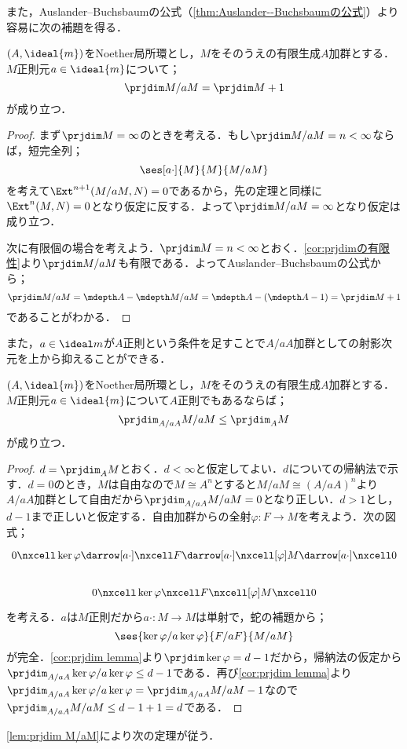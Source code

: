 また，Auslander--Buchsbaumの公式（\ref{thm:Auslander--Buchsbaumの公式}）より容易に次の補題を得る．

\begin{lem}\label{lem:prjdim M/aM}
	$(A,\ideal{m})$をNoether局所環とし，$M$をそのうえの有限生成$A$加群とする．$M$正則元$a\in\ideal{m}$について；
	\[\prjdim M/aM=\prjdim M+1\]
	が成り立つ．
\end{lem}

\begin{proof}
	まず$\prjdim M=\infty$のときを考える．もし$\prjdim M/aM=n<\infty$ならば，短完全列；
	\[\ses[a\cdot]{M}{M}{M/aM}\]
	を考えて$\Ext^{n+1}(M/aM,N)=0$であるから，先の定理と同様に$\Ext^n(M,N)=0$となり仮定に反する．よって$\prjdim M/aM=\infty$となり仮定は成り立つ．
	
	次に有限個の場合を考えよう．$\prjdim M=n<\infty$とおく．\ref{cor:prjdimの有限性}より$\prjdim M/aM$も有限である．よってAuslander--Buchsbaumの公式から；
	\[\prjdim M/aM=\mdepth A-\mdepth M/aM=\mdepth A-(\mdepth A-1)=\prjdim M+1\]
	であることがわかる．
\end{proof}

また，$a\in\ideal m$が$A$正則という条件を足すことで$A/aA$加群としての射影次元を上から抑えることができる．

\begin{lem}\label{lem:prjdim_A/aA M/aM}
	$(A,\ideal{m})$をNoether局所環とし，$M$をそのうえの有限生成$A$加群とする．$M$正則元$a\in\ideal{m}$について$A$正則でもあるならば；
	\[\prjdim_{A/aA} M/aM\leq \prjdim_A M\]
	が成り立つ．
\end{lem}

\begin{proof}
	$d=\prjdim_A M$とおく．$d<\infty$と仮定してよい．$d$についての帰納法で示す．$d=0$のとき，$M$は自由なので$M\cong A^n$とすると$M/aM\cong(A/aA)^n$より$A/aA$加群として自由だから$\prjdim_{A/aA}M/aM=0$となり正しい．$d>1$とし，$d-1$まで正しいと仮定する．自由加群からの全射$\varphi:F\to M$を考えよう．次の図式；
	\[\begin{tikzcd}
		0\nxcell\ker\varphi\darrow[a\cdot]\nxcell F\darrow[a\cdot]\nxcell[\varphi]M\darrow[a\cdot]\nxcell0\\
		0\nxcell \ker\varphi\nxcell F\nxcell[\varphi]M\nxcell0
	\end{tikzcd}\]
	を考える．$a$は$M$正則だから$a\cdot:M\to M$は単射で，蛇の補題から；
	\[\ses{\ker\varphi/a\ker\varphi}{F/aF}{M/aM}\]
	が完全．\ref{cor:prjdim lemma}より$\prjdim\ker\varphi=d-1$だから，帰納法の仮定から$\prjdim_{A/aA}\ker\varphi/a\ker\varphi\leq d-1$である．再び\ref{cor:prjdim lemma}より$\prjdim_{A/aA}\ker\varphi/a\ker\varphi=\prjdim_{A/aA}M/aM-1$なので$\prjdim_{A/aA}M/aM\leq d-1+1=d$である．
\end{proof}
\ref{lem:prjdim M/aM}により次の定理が従う．

